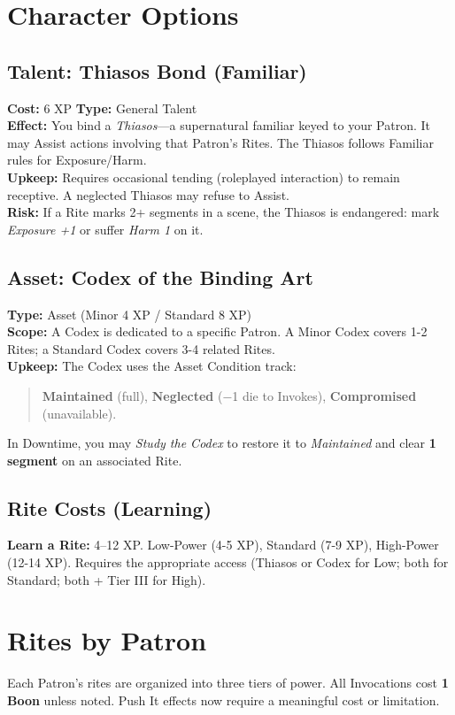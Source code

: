 \documentclass[12pt,twoside]{book}
\begin{document}
\section{Character Options}
\subsection{Talent: Thiasos Bond (Familiar)}
\label{subsec:thiasos-bond}
\textbf{Cost:} 6 XP \hfill \textbf{Type:} General Talent \\
\textbf{Effect:} You bind a \emph{Thiasos}---a supernatural familiar keyed to your Patron. It may Assist actions involving that Patron's Rites. The Thiasos follows Familiar rules for Exposure/Harm.\\
\textbf{Upkeep:} Requires occasional tending (roleplayed interaction) to remain receptive. A neglected Thiasos may refuse to Assist.\\
\textbf{Risk:} If a Rite marks 2+ segments in a scene, the Thiasos is endangered: mark \emph{Exposure +1} or suffer \emph{Harm 1} on it.

\subsection{Asset: Codex of the Binding Art}
\label{subsec:codex-asset}
\textbf{Type:} Asset (Minor 4 XP / Standard 8 XP) \\
\textbf{Scope:} A Codex is dedicated to a specific Patron. A Minor Codex covers 1-2 Rites; a Standard Codex covers 3-4 related Rites.\\
\textbf{Upkeep:} The Codex uses the Asset Condition track:
\begin{quote}
\textbf{Maintained} (full), \textbf{Neglected} (−1 die to Invokes), \textbf{Compromised} (unavailable).
\end{quote}
In Downtime, you may \emph{Study the Codex} to restore it to \emph{Maintained} and clear \textbf{1 segment} on an associated Rite.

\subsection{Rite Costs (Learning)}
\textbf{Learn a Rite:} 4–12 XP. Low-Power (4-5 XP), Standard (7-9 XP), High-Power (12-14 XP). Requires the appropriate access (Thiasos or Codex for Low; both for Standard; both + Tier III for High).

\section{Rites by Patron}
Each Patron's rites are organized into three tiers of power. All Invocations cost \textbf{1 Boon} unless noted. Push It effects now require a meaningful cost or limitation.
\end{document}
